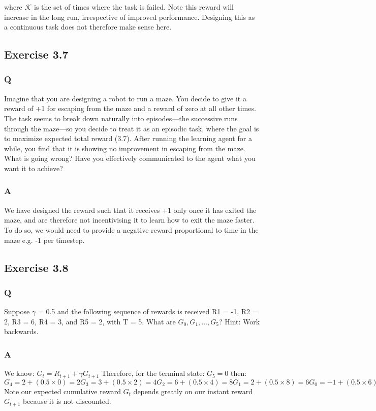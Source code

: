 where \(\mathcal{K}\) is the set of times where the task is failed. Note this reward will increase in the long run, irrespective of improved performance. Designing this as a continuous task does not therefore make sense here.

\subsection{Exercise 3.7}
\subsubsection*{Q}
Imagine that you are designing a robot to run a maze. You decide to give it a reward of +1 for escaping from the maze and a reward of zero at all other times. The task seems to break down naturally into episodes—the successive runs through the maze—so you decide to treat it as an episodic task, where the goal is to maximize expected total reward (3.7). After running the learning agent for a while, you find that it is showing no improvement in escaping from the maze. What is going  wrong? Have you effectively communicated to the agent what you want it to achieve?

\subsubsection*{A}
We have designed the reward such that it receives +1 only once it has exited the maze, and are therefore not incentivising it to learn how to exit the maze faster. To do so, we would need to provide a negative reward proportional to time in the maze e.g. -1 per timestep.

\subsection{Exercise 3.8}
\subsubsection*{Q}
Suppose \(\gamma\) = 0.5 and the following sequence of rewards is received R1 = -1, R2 = 2, R3 = 6, R4 = 3, and R5 = 2, with T = 5. What are \(G_0, G_1, \ldots, G_5\)? Hint: Work backwards.

\subsubsection*{A}
We know:
$
G_t = R_{t+1} + \gamma G_{t+1}
$
Therefore, for the terminal state:
$
G_5 = 0
$
then:
$
G_4 = 2 +  (0.5 \times 0) = 2
G_3 = 3 + (0.5 \times 2) = 4
G_2 = 6 + (0.5 \times 4) = 8
G_1 = 2 + (0.5 \times 8) = 6
G_0 = -1 + (0.5 \times 6) = 2
$
Note our expected cumulative reward \(G_t\) depends greatly on our instant reward \(G_{t+1}\) because it is not  discounted.

